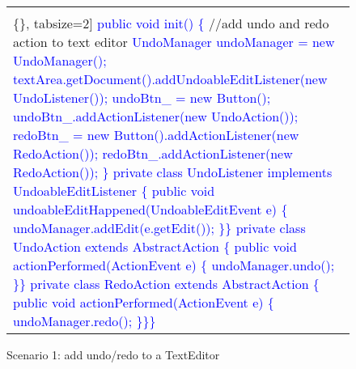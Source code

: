 \begin{figure}[!htb]
\begin{minipage}{0.5\textwidth}
\begin{tabular}{@{}p{}}
\begin{Verbatim}[commandchars=\\\{\}, tabsize=2]
\textcolor{blue}{   public void init() \{}
   //add undo and redo action to text editor
\textcolor{blue}{   UndoManager undoManager = new UndoManager(); }
\textcolor{blue}{   textArea.getDocument().addUndoableEditListener(new UndoListener());}
\textcolor{blue}{   undoBtn_ = new Button();}
\textcolor{blue}{   undoBtn_.addActionListener(new UndoAction());}
\textcolor{blue}{   redoBtn_ = new Button().addActionListener(new RedoAction());}
\textcolor{blue}{   redoBtn_.addActionListener(new RedoAction());}
\textcolor{blue}{   \}}
\textcolor{blue}{ private class UndoListener implements UndoableEditListener \{}
\textcolor{blue}{  public void undoableEditHappened(UndoableEditEvent e) \{}
\textcolor{blue}{    undoManager.addEdit(e.getEdit());}
\textcolor{blue}{  \}\}}
\textcolor{blue}{private class UndoAction extends AbstractAction \{}
\textcolor{blue}{  public void actionPerformed(ActionEvent e) \{   }
\textcolor{blue}{    undoManager.undo(); }
\textcolor{blue}{  \}\}}
\textcolor{blue}{private class RedoAction extends AbstractAction \{}
\textcolor{blue}{  public void actionPerformed(ActionEvent e) \{}
\textcolor{blue}{     undoManager.redo();}
\textcolor{blue}{  \}\}\}}
  \end{Verbatim}
      \vspace{-4mm}
     \\ \hline
\end{tabular} 
\caption{Scenario 1: add undo/redo to a TextEditor}
\label{fig:undoEditor}
\end{minipage}
\end{figure}






